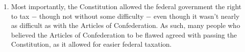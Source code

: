 \documentclass[12pt]{article}
\begin{document}
\begin{enumerate}
\begin{enumerate}
      \item Most importantly, the Constitution allowed the federal government the right to tax $-$ though not without some difficulty $-$ even though it wasn't nearly as difficult as with the Articles of Confederation. As such, many people who believed the Articles of Confederation to be flawed agreed with passing the Constitution, as it allowed for easier federal taxation.

    \end{enumerate}

\end{enumerate}
\end{document}
